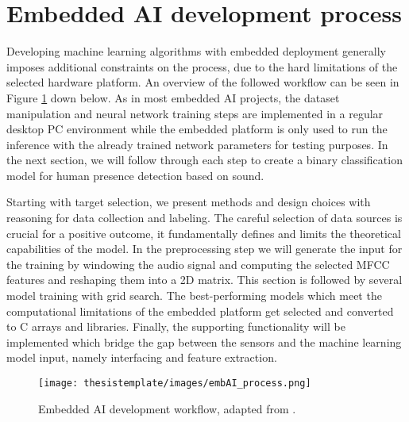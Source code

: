 \section{Embedded AI development process}

Developing machine learning algorithms with embedded deployment generally imposes additional constraints on the process, due to the hard limitations of the selected hardware platform. An overview of the followed workflow can be seen in Figure \ref{fig:embAI_workflow} down below. As in most embedded AI projects, the dataset manipulation and neural network training steps are implemented in a regular desktop PC environment while the embedded platform is only used to run the inference with the already trained network parameters for testing purposes. In the next section, we will follow through each step to create a binary classification model for human presence detection based on sound. 

Starting with target selection, we present methods and design choices with reasoning for data collection and labeling. The careful selection of data sources is crucial for a positive outcome, it fundamentally defines and limits the theoretical capabilities of the model. In the preprocessing step we will generate the input for the training by windowing the audio signal and computing the selected MFCC features and reshaping them into a 2D matrix. This section is followed by several model training with grid search. The best-performing models which meet the computational limitations of the embedded platform get selected and converted to C arrays and libraries. Finally, the supporting functionality will be implemented which bridge the gap between the sensors and the machine learning model input, namely interfacing and feature extraction.




\begin{figure}[ht!]
  \begin{center}
    \texttt{[image: thesistemplate/images/embAI\_process.png]}
    \caption{Embedded AI development workflow, adapted from \cite{wang2020fannonmcu}.}
    \label{fig:embAI_workflow}
  \end{center}
\end{figure}




